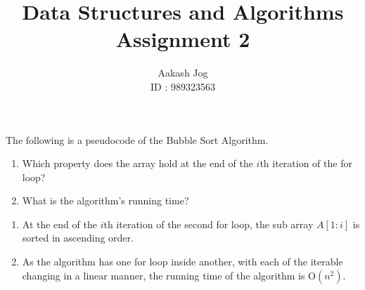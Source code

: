 \documentclass[fleqn, a4paper, 11pt, oneside]{amsart}
\title
[
	DS\&A : Assignment 2
]
{
	Data Structures and Algorithms\\
	Assignment 2
}
\author
{
	Aakash Jog\\
	ID : 989323563
}
\date{\formatdate{29}{3}{2016}}
\theoremstyle{definition}
\theoremstyle{theorem}
\begin{document}
\maketitle

\begin{question}
	The following is a pseudocode of the Bubble Sort Algorithm.
	\begin{algorithm}
		\begin{algorithmic}[1]
			\Statex
						\EndIf
					\EndFor
				\EndFor
			\EndProcedure
			\Statex
			\EndProcedure
		\end{algorithmic}
	\end{algorithm}
	\begin{enumerate}
		\item Which property does the array hold at the end of the $i$th iteration of the for loop?
		\item What is the algorithm's running time?
	\end{enumerate}
\end{question}

\begin{solution}
	\begin{enumerate}[leftmargin=*]
		\item
			At the end of the $i$th iteration of the second for loop, the sub array $A[1:i]$ is sorted in ascending order.
		\item
			As the algorithm has one for loop inside another, with each of the iterable changing in a linear manner, the running time of the algorithm is $\mathrm{O}\left( n^2 \right)$.
	\end{enumerate}
\end{solution}
\end{document}
